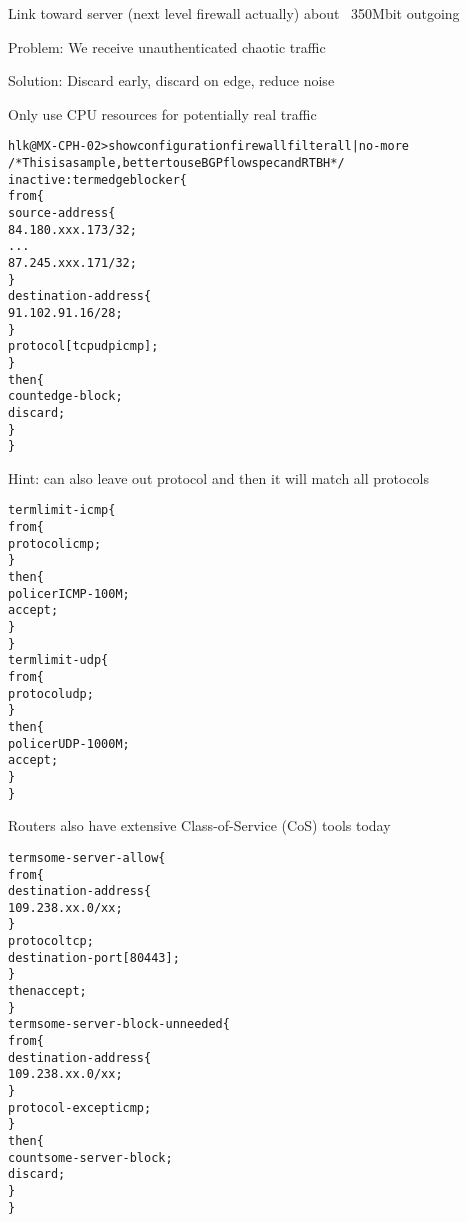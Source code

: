 \documentclass[20pt,landscape,a4paper,footrule]{foils}
\begin{document}
\centerline{Link toward server (next level firewall actually) about ~350Mbit outgoing}


\begin{list1}
\item Problem: We receive unauthenticated chaotic traffic

\item Solution: Discard early, discard on edge, reduce noise

\item Only use CPU resources for potentially real traffic
\end{list1}





\begin{alltt}\footnotesize
hlk@MX-CPH-02> show configuration firewall filter all | no-more
/* This is a sample, better to use BGP flowspec and RTBH */
inactive: term edgeblocker \{
    from \{
        source-address \{
            84.180.xxx.173/32;
...
            87.245.xxx.171/32;
        \}
        destination-address \{
            91.102.91.16/28;
        \}
        protocol [ tcp udp icmp ];
    \}
    then \{
        count edge-block;
        discard;
    \}
\}
\end{alltt}
Hint: can also leave out protocol and then it will match all protocols


\begin{alltt}\footnotesize
term limit-icmp \{
    from \{
        protocol icmp;
    \}
    then \{
        policer ICMP-100M;
        accept;
    \}
\}
term limit-udp \{
    from \{
        protocol udp;
    \}
    then \{
        policer UDP-1000M;
        accept;
    \}
\}
\end{alltt}

Routers also have extensive Class-of-Service (CoS) tools today


\begin{alltt}\footnotesize
term some-server-allow \{
    from \{
        destination-address \{
            109.238.xx.0/xx;
        \}
        protocol tcp;
        destination-port [ 80 443 ];
    \}
    then accept;
\}
term some-server-block-unneeded \{
    from \{
        destination-address \{
            109.238.xx.0/xx;
        \}
        protocol-except icmp;
    \}
    then \{
        count some-server-block;
        discard;
    \}
\}
\end{alltt}
\end{document}
